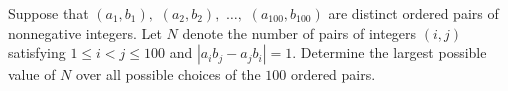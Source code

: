 Suppose that $(a_1,b_1),$ $(a_2,b_2),$ $\dots,$ $(a_{100},b_{100})$ are distinct ordered pairs of nonnegative integers. Let $N$ denote the number of pairs of integers $(i,j)$ satisfying $1\leq i<j\leq 100$ and $|a_ib_j-a_jb_i|=1$. Determine the largest possible value of $N$ over all possible choices of the $100$ ordered pairs.


